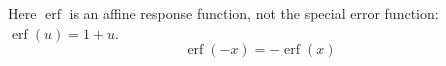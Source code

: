 \documentclass{article}
\DeclareMathOperator{\ERF}{erf}
\begin{document}
Here $\ERF$ is an affine response function, not the special error function:
$\ERF(u)=1+u$.
\begin{equation}
  \ERF(-x)=-\ERF(x)
\end{equation}
\end{document}
